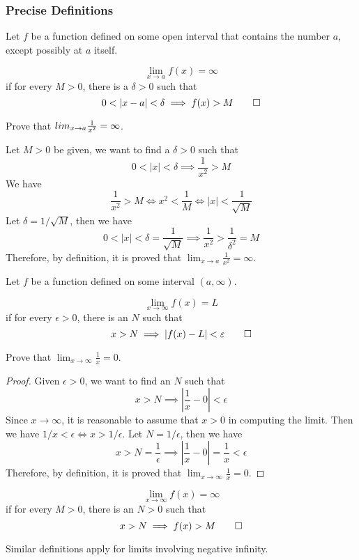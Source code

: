 \subsubsection{Precise Definitions}
Let \(f\) be a function defined on some open interval that contains the number
\(a\), except possibly at \(a\) itself.
\begin{definition}
    \[\lim_{x\to a}f(x)=\infty\]
    if for every \(M>0\), there is a
    \(\delta>0\) such that
    \[0<|x-a|<\delta\implies f(x)>M\qedhere\]
\end{definition}
\begin{problem}
    Prove that \(\\lim_{x\to a}\frac{1}{x^2}=\infty\).
\end{problem}
\begin{solution}
    Let \(M>0\) be given, we want to find a \(\delta>0\) such that
    \[0<|x|<\delta\implies\frac{1}{x^2}>M\]
    We have
    \[\frac{1}{x^2}>M\iff x^2<\frac{1}{M}\iff|x|<\frac{1}{\sqrt{M}}\]
    Let \(\delta=1/\sqrt{M}\), then we have
    \[0<|x|<\delta=\frac{1}{\sqrt{M}}\implies\frac{1}{x^2}
    >\frac{1}{\delta^2}=M\]
    Therefore, by definition, it is proved that
    \(\displaystyle{\lim_{x\to a}\frac{1}{x^2}=\infty}\).
\end{solution}
Let \(f\) be a function defined on some interval \((a,\infty)\).
\begin{definition}
    \[\lim_{x\to \infty}f(x)=L\]
    if for every \(\epsilon>0\), there is an
    \(N\) such that
    \[x>N\implies|f(x)-L|<\epsilon\qedhere\]
\end{definition}
\begin{problem}
    Prove that \(\lim_{x\to \infty}\frac{1}{x}=0\).
\end{problem}
\begin{proof}
    Given \(\epsilon>0\), we want to find an \(N\) such that
    \[x>N\implies\left|\frac{1}{x}-0\right|<\epsilon\]
    Since \(x\to \infty\), it is reasonable to assume that \(x>0\) in
    computing the limit.
    Then we have \(1/x<\epsilon\iff x>1/\epsilon\).
    Let \(N=1/\epsilon\), then we have
    \[x>N=\frac{1}{\epsilon}\implies\left|\frac{1}{x}-0\right|=\frac{1}{x}
    <\epsilon\]
    Therefore, by definition, it is proved that
    \(\displaystyle{\lim_{x\to \infty}\frac{1}{x}=0}\).
\end{proof}
\begin{definition}
    \[\lim_{x\to \infty}f(x)=\infty\] if for every \(M>0\), there is an
    \(N>0\) such that \[x>N\implies f(x)>M\qedhere\]
\end{definition}
Similar definitions apply for limits involving negative infinity.
